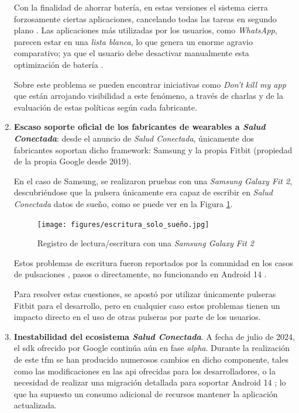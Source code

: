 \begin{enumerate}
        Con la finalidad de ahorrar batería, en estas versiones el sistema cierra forzosamente ciertas aplicaciones, cancelando todas las tareas en segundo plano \cite{manohar_is_2020}. Las aplicaciones más utilizadas por los usuarios, como \textit{WhatsApp}, parecen estar en una \textit{lista blanca}, lo que genera un enorme agravio comparativo; ya que el usuario debe desactivar manualmente esta optimización de batería \cite{shukla_work_2021}.
    
        Sobre este problema se pueden encontrar iniciativas como \textit{Don't kill my app} \cite{dont_kill_my_app_our_nodate} que están arrojando visibilidad a este fenómeno, a través de charlas y de la evaluación de estas políticas según cada fabricante.
    
        \item \textbf{Escaso soporte oficial de los fabricantes de \glspl{wearable} a \textit{Salud Conectada}}: desde el anuncio de \textit{Salud Conectada}, únicamente dos fabricantes soportan dicho \gls{framework}: Samsung y la propia Fitbit (propiedad de la propia Google desde 2019). 
        
        En el caso de Samsung, se realizaron pruebas con una \textit{Samsung Galaxy Fit 2}, descubriéndose que la pulsera únicamente era capaz de escribir en \textit{Salud Conectada} datos de sueño, como se puede ver en la Figura \ref{figure:problemas:samsung_sueño}.
    
        \begin{figure}[h]
            \centering
            \texttt{[image: figures/escritura\_solo\_sueño.jpg]}
            \caption{Registro de lectura/escritura con una \textit{Samsung Galaxy Fit 2}}
            \label{figure:problemas:samsung_sueño}
        \end{figure}
    
        Estos problemas de escritura fueron reportados por la comunidad en los casos de pulsaciones \cite{jauwaadshams_heart_2023}, pasos \cite{ste1603137554_samsung_2022} o directamente, no funcionando en Android 14 \cite{muzzas_samsung_2023}.
    
        Para resolver estas cuestiones, se apostó por utilizar únicamente pulseras Fitbit para el desarrollo, pero en cualquier caso estos problemas tienen un impacto directo en el uso de otras pulseras por parte de los usuarios.
        
        \item \textbf{Inestabilidad del ecosistema \textit{Salud Conectada}}. A fecha de julio de 2024, el \gls{sdk} ofrecido por Google continúa aún en fase \textit{alpha}. Durante la realización de este \gls{tfm} se han producido numerosos cambios en dicho componente, tales como las modificaciones en las \gls{api} ofrecidas para los desarrolladores, o la necesidad de realizar una migración detallada para soportar Android 14 \cite{android_developers_migrate_nodate}; lo que ha supuesto un consumo adicional de recursos mantener la aplicación actualizada.
    

\end{enumerate}

